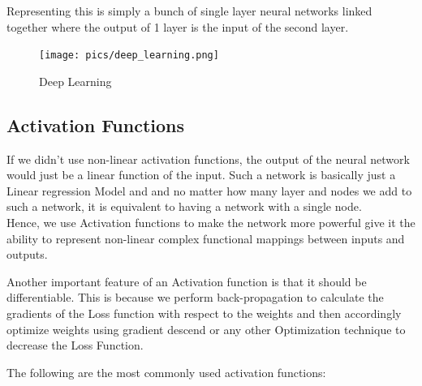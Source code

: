 \documentclass[twoside]{article}
\begin{document}
Representing this is simply a bunch of single layer neural networks linked together where the output of 1 layer is the input of the second layer.

\begin{figure}[!htb]
\centering
\texttt{[image: pics/deep\_learning.png]}
\caption{Deep Learning\cite{}}
\label{fig:Deep Learning}
\end{figure}

\subsection{Activation Functions}

If we didn't use non-linear activation functions, the output of the neural network would just be a linear function of the input. Such a network is basically just a Linear regression Model and and no matter how many layer and nodes we add to such a network, it is equivalent to having a network with a single node.\\

Hence, we use Activation functions to make the network more powerful give it the ability to represent non-linear complex functional mappings between inputs and outputs.

Another important feature of an Activation function is that it should be differentiable. This is because we perform back-propagation to calculate the gradients of the Loss function with respect to the weights and then accordingly optimize weights using gradient descend or any other Optimization technique to decrease the Loss Function.

The following are the most commonly used activation functions:
\end{document}
